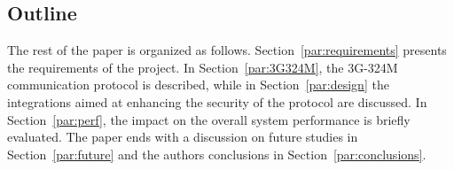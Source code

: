 \documentclass[10pt, conference, compsocconf]{IEEEtran}
\begin{document}

\subsection{Outline}
The rest of the paper is organized as follows. Section~\ref{par:requirements} presents the requirements of the project. In Section~\ref{par:3G324M}, the 3G-324M communication protocol is described, while in Section~\ref{par:design} the integrations aimed at enhancing the security of the protocol are discussed. In Section~\ref{par:perf}, the impact on the overall system performance is briefly evaluated. The paper ends with a discussion on future studies in Section~\ref{par:future} and the authors conclusions in Section~\ref{par:conclusions}.
\end{document}
